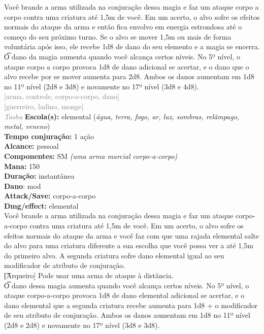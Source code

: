 \documentclass{RPG_Adventure}[2021/10/20]
\begin{document}
{\normalsize Você brande a arma utilizada na conjuração dessa magia e faz um ataque corpo a corpo contra uma criatura até 1,5m de você. Em um acerto, o alvo sofre os efeitos normais do ataque da arma e então fica envolvo em energia estrondosa até o começo do seu próximo turno. Se o alvo se mover 1,5m ou mais de forma voluntária após isso, ele recebe 1d8 de dano do seu elemento e a magia se encerra.\\\t O dano da magia aumenta quando você alcança certos níveis. No 5º nível, o ataque corpo a corpo provoca 1d8 de dano adicional se acertar, e o dano que o alvo recebe por se mover aumenta para 2d8. Ambos os danos aumentam em 1d8 no 11º nível (2d8 e 3d8) e novamente no 17º nível (3d8 e 4d8).\\}
{\scriptsize \textcolor{gray}{[arma, controle, corpo-a-corpo, dano]\\}}
{\scriptsize \textcolor{gray}{[guerreiro, ladino, monge]\\}}
{\tiny \textcolor{gray}{\textit{Tasha}}}\jump{}
{\small \t \textbf{Escola(s):} elemental (\textit{água, terra, fogo, ar, luz, sombras, relâmpago, metal, veneno})\\\t \textbf{Tempo conjuração:} 1 ação\\\t \textbf{Alcance:} pessoal\\\t \textbf{Componentes:} SM \textit{(uma arma marcial corpo-a-corpo)}\\\t \textbf{Mana:} 150\\\t \textbf{Duração:} instantânea\\\t \textbf{Dano}: mod\\\t \textbf{Attack/Save:} corpo-a-corpo\\\t \textbf{Dmg/effect:} elemental\\}
{\normalsize Você brande a arma utilizada na conjuração dessa magia e faz um ataque corpo-a-corpo contra uma criatura até 1,5m de você. Em um acerto, o alvo sofre os efeitos normais do ataque da arma e você faz com que uma rajada elemental salte do alvo para uma criatura diferente a sua escolha que você possa ver a até 1,5m do primeiro alvo. A segunda criatura sofre dano elemental igual ao seu modificador de atributo de conjuração.\\\t [Arqueiro] Pode usar uma arma de ataque à distância.\\\t O dano dessa magia aumenta quando você alcança certos níveis. No 5º nível, o ataque corpo-a-corpo provoca 1d8 de dano elemental adicional se acertar, e o dano elemental que a segunda criatura recebe aumenta para 1d8 + o modificador de seu atributo de conjuração. Ambos os danos aumentam em 1d8 no 11º nível (2d8 e 2d8) e novamente no 17º nível (3d8 e 3d8).\\}
\end{document}
